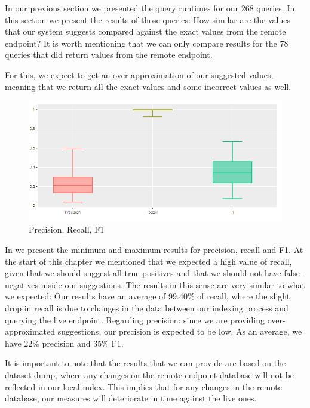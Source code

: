 In our previous section we presented the query runtimes for our 268 queries. In this section we present the results of those queries: How similar are the values that our system suggests compared against the exact values from the remote endpoint? It is worth mentioning that we can only compare  results for the 78 queries that did return values from the remote endpoint. 

For this, we expect to get an over-approximation of our suggested values, meaning that we return all the exact values and some incorrect values as well. 

\begin{figure}[ht]
    \centering
        \includegraphics[width=\linewidth]{imagenes/resultsCandleStick.png}
        \caption{Precision, Recall, F1}
        \label{fig:resultsCandles}
\end{figure}

In  we present the minimum and maximum results for precision, recall and F1. At the start of this chapter we mentioned that we expected a high value of recall, given that we should suggest all true-positives and that we should not have false-negatives inside our suggestions. The results in this sense are very similar to what we expected: Our results have an average of 99.40\% of recall, where the slight drop in recall is due to changes in the data between our indexing process and querying the live endpoint. Regarding precision: since we are providing over-approximated suggestions, our precision is expected to be low. As an average, we have 22\% precision and 35\% F1.

It is important to note that the results that we can provide are based on the dataset dump, where any changes on the remote endpoint database will not be reflected in our local index. This implies that for any changes in the remote database, our measures will deteriorate in time against the live ones.


